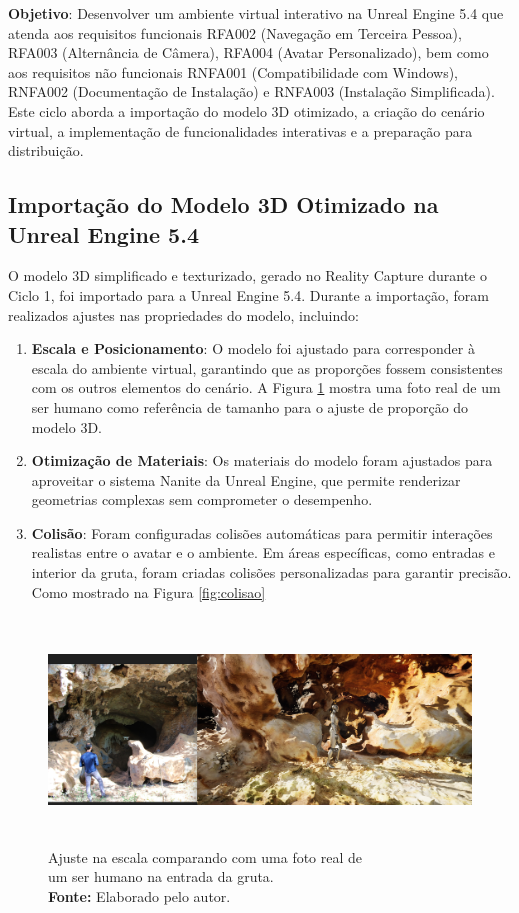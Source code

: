 \textbf{Objetivo}: Desenvolver um ambiente virtual interativo na Unreal Engine 5.4 que atenda aos requisitos funcionais RFA002 (Navegação em Terceira Pessoa), RFA003 (Alternância de Câmera), RFA004 (Avatar Personalizado), bem como aos requisitos não funcionais RNFA001 (Compatibilidade com Windows), RNFA002 (Documentação de Instalação) e RNFA003 (Instalação Simplificada). Este ciclo aborda a importação do modelo 3D otimizado, a criação do cenário virtual, a implementação de funcionalidades interativas e a preparação para distribuição.

\subsection{Importação do Modelo 3D Otimizado na Unreal Engine 5.4}
O modelo 3D simplificado e texturizado, gerado no Reality Capture durante o Ciclo 1, foi importado para a Unreal Engine 5.4. Durante a importação, foram realizados ajustes nas propriedades do modelo, incluindo:
\begin{enumerate}
    \item \textbf{Escala e Posicionamento}: O modelo foi ajustado para corresponder à escala do ambiente virtual, garantindo que as proporções fossem consistentes com os outros elementos do cenário. A Figura \ref{fig:escala} mostra uma foto real de um ser humano como referência de tamanho para o ajuste de proporção do modelo 3D.
    \item \textbf{Otimização de Materiais}: Os materiais do modelo foram ajustados para aproveitar o sistema Nanite da Unreal Engine, que permite renderizar geometrias complexas sem comprometer o desempenho.
    \item \textbf{Colisão}: Foram configuradas colisões automáticas para permitir interações realistas entre o avatar e o ambiente. Em áreas específicas, como entradas e interior da gruta, foram criadas colisões personalizadas para garantir precisão. Como mostrado na Figura \ref{fig:colisao}
\end{enumerate}

\begin{figure}[H]
        \centering
        \includegraphics[height=6cm, keepaspectratio]{img/unreal/escala.png}
        \caption{Ajuste na escala comparando com uma foto real de\\ um ser humano na entrada da gruta. \\
            \textbf{Fonte:} Elaborado pelo autor.}
        \label{fig:escala}
\end{figure}

